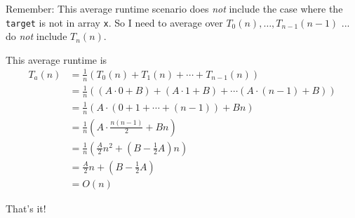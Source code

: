 Remember: This average runtime scenario
does \textit{not} include the case where the \verb!target!
is not in array \verb!x!.
So I need to average over $T_0(n), \ldots, T_{n-1}(n-1)$ ... 
do \textit{not} include $T_n(n)$.

This average runtime is
\begin{align*}
T_a(n) 
&= \frac{1}{n} 
   \left(
     T_0(n) + T_1(n) + \cdots + T_{n - 1}(n) 
   \right)
\\
&= \frac{1}{n}
   \left(
     (A\cdot 0 + B) + 
     (A\cdot 1 + B) + 
     \cdots
     (A\cdot (n - 1) + B)
   \right)
\\
&= \frac{1}{n}
   \left(
     A\cdot (0 + 1 + \cdots + (n - 1))
     + Bn 
   \right)
\\
&= \frac{1}{n}
   \left(
     A \cdot \frac{n(n-1)}{2} + Bn
   \right)
\\
&= \frac{1}{n}
   \left( 
     \frac{A}{2} n^2
     + \left( B - \frac{1}{2}A \right) n
   \right)
\\
&= \frac{A}{2} n
   + \left( B - \frac{1}{2}A \right)
\\
&= O(n)
\end{align*}


That's it!

\newpage
\newpage
\newpage
\newpage
\newpage
